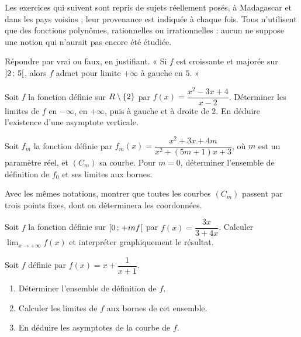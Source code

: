 \begin{annales}
Les exercices qui suivent sont repris de sujets réellement posés, à Madagascar
et dans les pays voisins ; leur provenance est indiquée à chaque fois. Tous
n'utilisent que des fonctions polynômes, rationnelles ou irrationnelles :
aucun ne suppose une notion qui n'aurait pas encore été étudiée.

Répondre par vrai ou faux, en justifiant.
« Si $f$ est croissante et majorée sur $\left]2\,;\,5\right[$, alors $f$ admet
pour limite $+\infty$ à gauche en $5$. »

Soit $f$ la fonction définie sur $R \setminus \{2\}$ par
$f(x) = \dfrac{x^{2}-3x+4}{x-2}$.
Déterminer les limites de $f$ en $-\infty$, en $+\infty$, puis à gauche et à
droite de $2$. En déduire l'existence d'une asymptote verticale.

Soit $f_{m}$ la fonction définie par
$f_{m}(x) = \dfrac{x^{2}+3x+4m}{x^{2}+(5m+1)x+3}$, où $m$ est un paramètre
réel, et $(C_{m})$ sa courbe. Pour $m = 0$, déterminer l'ensemble de
définition de $f_{0}$ et ses limites aux bornes.

Avec les mêmes notations, montrer que toutes les courbes $(C_{m})$ passent par
trois points fixes, dont on déterminera les coordonnées.

Soit $f$ la fonction définie sur $\left[0\,;\,+inf\right[$ par
$f(x) = \dfrac{3x}{3+4x}$. Calculer $\lim_{x\to+\infty}f(x)$ et interpréter
graphiquement le résultat.

Soit $f$ définie par $f(x) = x+\dfrac{1}{x+1}$.
\begin{enumerate}[label=\textbf{\alph*)}, leftmargin=*, itemsep=0.15em]
  \item Déterminer l'ensemble de définition de $f$.
  \item Calculer les limites de $f$ aux bornes de cet ensemble.
  \item En déduire les asymptotes de la courbe de $f$.
\end{enumerate}


\end{annales}
